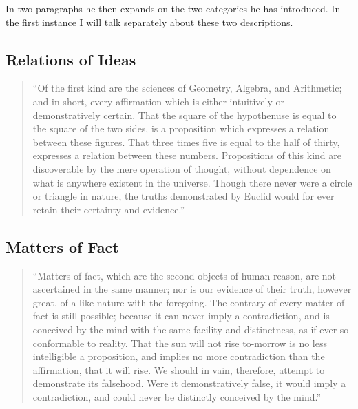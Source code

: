 In two paragraphs he then expands on the two categories he has introduced.
In the first instance I will talk separately about these two descriptions.

\subsection{Relations of Ideas}

\begin{quote}
``Of the first kind are the sciences of Geometry, Algebra, and Arithmetic; and in short, every affirmation which is either intuitively or demonstratively certain. That the square of the hypothenuse is equal to the square of the two sides, is a proposition which expresses a relation between these figures. That three times five is equal to the half of thirty, expresses a relation between these numbers. Propositions of this kind are discoverable by the mere operation of thought, without dependence on what is anywhere existent in the universe. Though there never were a circle or triangle in nature, the truths demonstrated by Euclid would for ever retain their certainty and evidence.''
\end{quote}

\subsection{Matters of Fact}

\begin{quote}
``Matters of fact, which are the second objects of human reason, are not ascertained in the same manner; nor is our evidence of their truth, however great, of a like nature with the foregoing. The contrary of every matter of fact is still possible; because it can never imply a contradiction, and is conceived by the mind with the same facility and distinctness, as if ever so conformable to reality. That the sun will not rise to-morrow is no less intelligible a proposition, and implies no more contradiction than the affirmation, that it will rise. We should in vain, therefore, attempt to demonstrate its falsehood. Were it demonstratively false, it would imply a contradiction, and could never be distinctly conceived by the mind.''
\end{quote}

